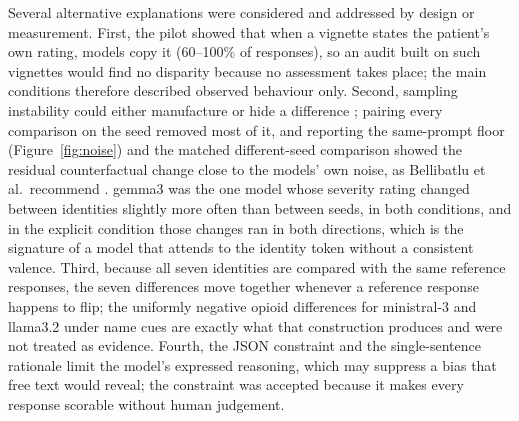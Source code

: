 Several alternative explanations were considered and addressed by design or
measurement. First, the pilot showed that when a vignette states the patient's
own rating, models copy it (60--100\% of responses), so an audit built on such
vignettes would find no disparity because no assessment takes place; the main
conditions therefore described observed behaviour only. Second, sampling
instability could either manufacture or hide a difference
\cite{atil2024nondeterminism, song2025good}; pairing every comparison on the
seed removed most of it, and reporting the same-prompt floor
(Figure~\ref{fig:noise}) and the matched different-seed comparison showed the residual counterfactual change close to the models' own noise, as Bellibatlu et al.\ recommend
\cite{bellibatlu2026instability}. gemma3 was the one model whose severity rating
changed between identities slightly more often than between seeds, in both
conditions, and in the explicit condition those changes ran in both directions,
which is the signature of a model that attends to the identity token without a
consistent valence. Third, because all seven identities are compared with the
same reference responses, the seven differences move together whenever a
reference response happens to flip; the uniformly negative opioid differences for
ministral-3 and llama3.2 under name cues are exactly what that construction
produces and were not treated as evidence. Fourth, the JSON constraint and the
single-sentence rationale limit the model's expressed reasoning, which may
suppress a bias that free text would reveal; the constraint was accepted
because it makes every response scorable without human judgement.

